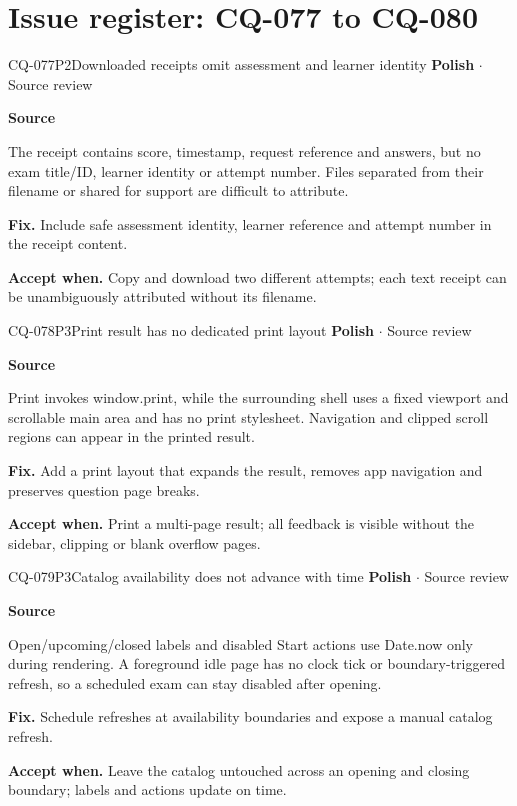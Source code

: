 \section*{Issue register: CQ-077 to CQ-080}
\begin{finding}{CQ-077}{P2}{Downloaded receipts omit assessment and learner identity}
\textbf{Polish} $\cdot$ Source review\par
\textbf{Source}\quad{}\par
The receipt contains score, timestamp, request reference and answers, but no exam title/ID, learner identity or attempt number. Files separated from their filename or shared for support are difficult to attribute.\par
\textbf{Fix.} Include safe assessment identity, learner reference and attempt number in the receipt content.\par
\textbf{Accept when.} Copy and download two different attempts; each text receipt can be unambiguously attributed without its filename.
\end{finding}
\begin{finding}{CQ-078}{P3}{Print result has no dedicated print layout}
\textbf{Polish} $\cdot$ Source review\par
\textbf{Source}\quad{}\par
Print invokes window.print, while the surrounding shell uses a fixed viewport and scrollable main area and has no print stylesheet. Navigation and clipped scroll regions can appear in the printed result.\par
\textbf{Fix.} Add a print layout that expands the result, removes app navigation and preserves question page breaks.\par
\textbf{Accept when.} Print a multi-page result; all feedback is visible without the sidebar, clipping or blank overflow pages.
\end{finding}
\begin{finding}{CQ-079}{P3}{Catalog availability does not advance with time}
\textbf{Polish} $\cdot$ Source review\par
\textbf{Source}\quad{}\par
Open/upcoming/closed labels and disabled Start actions use Date.now only during rendering. A foreground idle page has no clock tick or boundary-triggered refresh, so a scheduled exam can stay disabled after opening.\par
\textbf{Fix.} Schedule refreshes at availability boundaries and expose a manual catalog refresh.\par
\textbf{Accept when.} Leave the catalog untouched across an opening and closing boundary; labels and actions update on time.
\end{finding}
